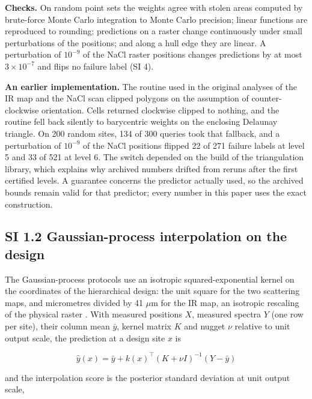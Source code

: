 \documentclass{iopjournal}
\begin{document}
\textbf{Checks.} On random point sets the weights agree with stolen areas computed by brute-force Monte Carlo integration to Monte Carlo precision; linear functions are reproduced to rounding; predictions on a raster change continuously under small perturbations of the positions; and along a hull edge they are linear. A perturbation of \(10^{-9}\) of the NaCl raster positions changes predictions by at most \(3 \times 10^{-7}\) and flips no failure label (SI 4).

\textbf{An earlier implementation.} The routine used in the original analyses of the IR map and the NaCl scan clipped polygons on the assumption of counter-clockwise orientation. Cells returned clockwise clipped to nothing, and the routine fell back silently to barycentric weights on the enclosing Delaunay triangle. On 200 random sites, 134 of 300 queries took that fallback, and a perturbation of \(10^{-9}\) of the NaCl positions flipped 22 of 271 failure labels at level 5 and 33 of 521 at level 6. The switch depended on the build of the triangulation library, which explains why archived numbers drifted from reruns after the first certified levels. A guarantee concerns the predictor actually used, so the archived bounds remain valid for that predictor; every number in this paper uses the exact construction.

\hypertarget{si-1.2-gaussian-process-interpolation-on-the-design}{%
\subsection*{SI 1.2 Gaussian-process interpolation on the design}\label{si-1.2-gaussian-process-interpolation-on-the-design}}

The Gaussian-process protocols use an isotropic squared-exponential kernel on the coordinates of the hierarchical design: the unit square for the two scattering maps, and micrometres divided by 41 \ensuremath{\mu}m for the IR map, an isotropic rescaling of the physical raster \cite{RasmussenWilliams2006}. With measured positions \(X\), measured spectra \(Y\) (one row per site), their column mean \(\bar y\), kernel matrix \(K\) and nugget \(\nu\) relative to unit output scale, the prediction at a design site \(x\) is

\[
\hat y(x) = \bar y + k(x)^\top (K + \nu I)^{-1} (Y - \bar y)
\]

and the interpolation score is the posterior standard deviation at unit output scale,
\end{document}
